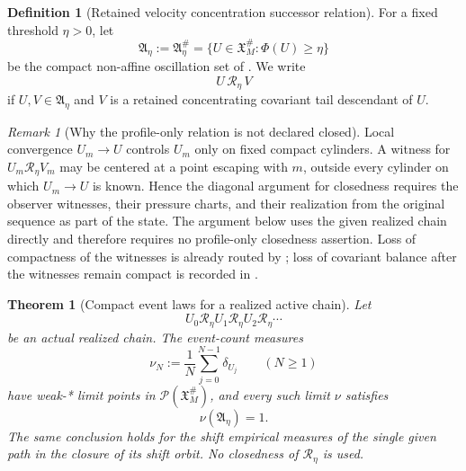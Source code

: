 \documentclass[11pt]{amsart}
\numberwithin{equation}{section}
\theoremstyle{plain}
\newtheorem{theorem}{Theorem}[section]
\theoremstyle{definition}
\newtheorem{definition}[definition]{Definition}
\theoremstyle{remark}
\newtheorem{remark}[remark]{Remark}
\begin{document}
\begin{definition}[Retained velocity concentration successor relation]
\label{def:active-successor-relation}
For a fixed threshold \(\eta>0\), let
\[
   \mathfrak A_\eta:=\mathfrak A_\eta^\#
   =
   \{U\in\mathfrak X_M^\#:\Phi(U)\ge\eta\}
\]
be the compact non-affine oscillation set of
.  We write
\[
   U\,\mathcal R_\eta\,V
\]
if \(U,V\in\mathfrak A_\eta\) and \(V\) is a retained concentrating covariant tail
descendant of \(U\).
\end{definition}

\begin{remark}[Why the profile-only relation is not declared closed]
\label{rem:profile-successor-not-closed}
Local convergence \(U_m\to U\) controls \(U_m\) only on fixed compact
cylinders.  A witness for \(U_m\mathcal R_\eta V_m\) may be centered at a
point escaping with \(m\), outside every cylinder on which \(U_m\to U\) is
known.  Hence the diagonal argument for closedness requires the observer
witnesses, their pressure charts, and their realization from the original
sequence as part of the state.  The argument below uses the given realized
chain directly and therefore requires no profile-only closedness assertion.
Loss of compactness of the witnesses is already routed by
; loss of covariant balance after
the witnesses remain compact is recorded in
.
\end{remark}

\begin{theorem}[Compact event laws for a realized active chain]
\label{thm:active-path-space-recurrence}
Let
\begin{equation}\label{eq:realized-active-chain}
   U_0\mathcal R_\eta U_1\mathcal R_\eta U_2\mathcal R_\eta\cdots
\end{equation}
be an actual realized chain.  The event-count measures
\begin{equation}\label{eq:active-event-count-measures}
   \nu_N:=\frac1N\sum_{j=0}^{N-1}\delta_{U_j}
   \qquad(N\ge1)
\end{equation}
have weak-* limit points in \(\mathcal P(\mathfrak X_M^\#)\), and every such
limit \(\nu\) satisfies
\begin{equation}\label{eq:event-law-retains-activity}
   \nu(\mathfrak A_\eta)=1.
\end{equation}
The same conclusion holds for the shift empirical measures of the single
given path in the closure of its shift orbit.  No closedness of
\(\mathcal R_\eta\) is used.
\end{theorem}
\end{document}
